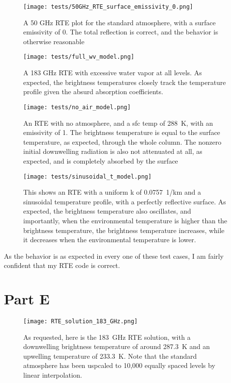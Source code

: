\documentclass{article}
\begin{document}
\begin{figure}[H]
    \texttt{[image: tests/50GHz\_RTE\_surface\_emissivity\_0.png]}
    \caption{A 50 GHz RTE plot for the standard atmosphere, with a surface emissivity of 0. The total reflection is correct, and the behavior is otherwise reasonable}
\end{figure}

\begin{figure}[H]
    \texttt{[image: tests/full\_wv\_model.png]}
    \caption{A 183 GHz RTE with excessive water vapor at all levels. As expected, the brightness temperatures closely track the temperature profile given the absurd absorption coefficients.}
\end{figure}

\begin{figure}[H]
    \texttt{[image: tests/no\_air\_model.png]}
    \caption{An RTE with no atmosphere, and a sfc temp of \qty{288}{K}, with an emissivity of 1. The brightness temperature is equal to the surface temperature, as expected, through the whole column. The nonzero initial downwelling radiation is also not attenuated at all, as expected, and is completely absorbed by the surface}
\end{figure}

\begin{figure}[H]
    \texttt{[image: tests/sinusoidal\_t\_model.png]}
    \caption{This shows an RTE with a uniform k of \qty{0.0757}{1/km} and a sinusoidal temperature profile, with a perfectly reflective surface. As expected, the brightness temperature also oscillates, and importantly, when the environmental temperature is higher than the brightness temperature, the brightness temperature increases, while it decreases when the environmental temperature is lower.}
\end{figure}

As the behavior is as expected in every one of these test cases, I am fairly confident that my RTE code is correct.

\section*{Part E}

\begin{figure}[H]
    \texttt{[image: RTE\_solution\_183\_GHz.png]}
    \caption{As requested, here is the \qty{183}{GHz} RTE solution, with a downwelling brightness temperature of around \qty{287.3}{K} and an upwelling temperature of \qty{233.3}{K}. Note that the standard atmosphere has been uspcaled to 10,000 equally spaced levels by linear interpolation.}
\end{figure}
\end{document}
